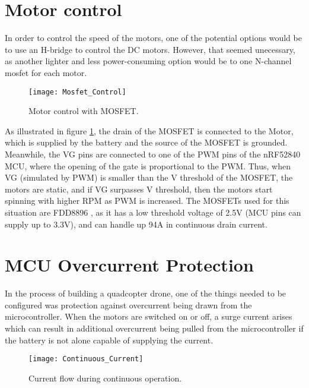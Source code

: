 \documentclass[12pt]{article}
\begin{document}
\setlength{\parskip}{0pt}
\section*{Motor control}
In order to control the speed of the motors, one of
the potential options would be to use an H-bridge to control
the DC motors. However, that seemed unecessary, as another 
lighter and less power-consuming option would be to one 
N-channel mosfet for each motor.

\begin{figure}[H]
    \begin{center}
    \texttt{[image: Mosfet\_Control]}
    \end{center}
    \caption{Motor control with MOSFET.}
    \label{fig:Mosfet_Control}
\end{figure}

As illustrated in figure \ref{fig:Mosfet_Control}, the drain
of the MOSFET is connected to the Motor, which is supplied by 
the battery and the source of the MOSFET is grounded. 
Meanwhile, the VG pins are connected to one of the PWM pins 
of the nRF52840 MCU, where the opening of the gate is 
proportional to the PWM. Thus, when VG (simulated by PWM) is 
smaller than the V threshold of the MOSFET, the motors are 
static, and if VG surpasses V threshold, then the motors 
start spinning with higher RPM as PWM is increased. 
The MOSFETs used for this situation are FDD8896 \cite{FDD8896}, as it has 
a low threshold voltage of 2.5V (MCU pins can supply 
up to 3.3V), and can handle up 94A in continuous drain 
current.

\section*{MCU Overcurrent Protection}
In the process of building a quadcopter drone, one 
of the things needed to be configured was protection 
against overcurrent being drawn from the 
microcontroller. When the motors are switched on or off, 
a surge current arises which can result in additional 
overcurrent being pulled from the microcontroller if 
the battery is not alone capable of supplying the current. 

\begin{figure}[H]
    \begin{center}
    \texttt{[image: Continuous\_Current]}
    \end{center}
    \caption{Current flow during continuous operation.}
    \label{fig:Continuous_Current}
\end{figure}
\end{document}
